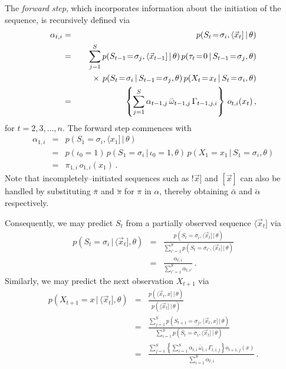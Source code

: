 \documentclass[a4paper]{article}
\begin{document}
The {\em forward step}, which incorporates information about the initiation of the sequence, is recursively defined via
\begin{eqnarray}
   \alpha_{t,i} & = & p(S_t\!=\!\sigma_i,\langle\vec{x}_t]\,|\,\theta)
\nonumber\\& = &
   \sum_{j=1}^{S}p(S_{t-1}\!=\!\sigma_j,\langle\vec{x}_{t-1}]\,|\,\theta)
      \,p(\tau_t\!=\!0\,|\,S_{t-1}\!=\!\sigma_j,\theta)
\nonumber\\&&
    \hspace*{5mm}{}\times\,p(S_t\!=\!\sigma_i\,|\,S_{t-1}\!=\!\sigma_j,\theta)\,p(X_t\!=\!x_t\,|\,S_t\!=\!\sigma_i,\theta)
\nonumber\\& = &
   \left\{\sum_{j=1}^{S}\alpha_{t-1,j}\,\bar{\omega}_{t-1,j}\,\Gamma_{t-1,j,i}\right\}\,o_{t,i}(x_t)\,,
\end{eqnarray}
for $t=2,3,\ldots,n$. The forward step commences with
\begin{eqnarray}
  \alpha_{1,i} & = & p(S_1\!=\!\sigma_i,\langle x_1]\,|\,\theta)
\nonumber\\& = & 
  p(\iota_0\!=\!1)\,p(S_1\!=\!\sigma_i\,|\,\iota_0\!=\!1,\theta)\,p(X_1\!=\!x_1\,|\,S_1\!=\!\sigma_i,\theta)
\nonumber\\& = & 
  \pi_{1,i}\,o_{1,i}(x_1)
\,.
\end{eqnarray}
Note that incompletely--initiated sequences such as $!\vec{x}]$ and $[\vec{x}]$ can also be handled by substituting $\bar{\pi}$ and $\breve{\pi}$ for $\pi$ in $\alpha$, thereby obtaining
$\bar{\alpha}$ and $\breve{\alpha}$ respectively.

Consequently, we may predict $S_t$ from a partially observed sequence $\langle\vec{x}_t]$ via
\begin{eqnarray}
  p(S_t\!=\!\sigma_i\,|\,\langle\vec{x}_t],\theta) & = & 
  \frac{p(S_t\!=\!\sigma_i,\langle\vec{x}_t]\,|\,\theta)}
       {\sum_{i'=1}^{S}p(S_t\!=\!\sigma_{i'},\langle\vec{x}_t]\,|\,\theta)}
\nonumber\\& = & 
  \frac{\alpha_{t,i}}{\sum_{i'=1}^{S}\alpha_{t,i'}}\,.
\end{eqnarray}
Similarly, we may predict the next observation $X_{t+1}$ via
\begin{eqnarray}
  p(X_{t+1}\!=\!x\,|\,\langle\vec{x}_t],\theta) 
& = &
  \frac{p(\langle\vec{x}_{t},x]\,|\,\theta)}
       {p(\langle\vec{x}_{t}]\,|\,\theta)}
\nonumber\\& = & 
  \frac{\sum_{j=1}^S p(S_{t+1}\!=\!\sigma_j,\langle\vec{x}_{t},x]\,|\,\theta)}
       {\sum_{i=1}^S p(S_{t}\!=\!\sigma_i,\langle\vec{x}_{t}]\,|\,\theta)}
\nonumber\\& = & 
  \frac{\sum_{j=1}^S\left\{\sum_{i=1}^S\alpha_{t,i}\,\bar{\omega}_{t,i}\,\Gamma_{t,i,j}\right\}o_{t+1,j}(x)}
       {\sum_{i=1}^S\alpha_{t,i}}
\,.
\end{eqnarray}
\end{document}
